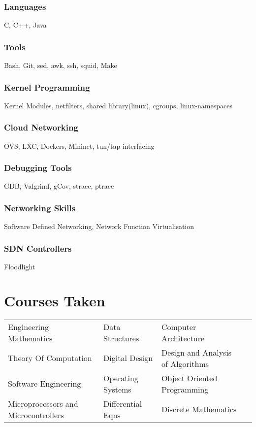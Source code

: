 \documentclass{article}
\begin{document}
\subsubsection{Languages}

C, C++, Java

\subsubsection{Tools}

Bash, Git, sed, awk, ssh, squid, Make

\subsubsection{Kernel Programming}

Kernel Modules, netfilters, shared library(linux), cgroups, linux-namespaces

\subsubsection{Cloud Networking}

OVS, LXC, Dockers, Mininet, tun/tap interfacing

\subsubsection{Debugging Tools}

GDB, Valgrind, gCov, strace, ptrace

\subsubsection{Networking Skills}

Software Defined Networking, Network Function Virtualisation

\subsubsection{SDN Controllers}

Floodlight


\section{Courses Taken}

\begin{tabular}[h]{l l l l}
	Engineering Mathematics & Data Structures & Computer Architecture \\
	Theory Of Computation & Digital Design & Design and Analysis of Algorithms\\
	Software Engineering & Operating Systems & Object Oriented Programming \\
	Microprocessors and Microcontrollers & Differential Eqns & Discrete Mathematics\\
\end{tabular}
\end{document}
